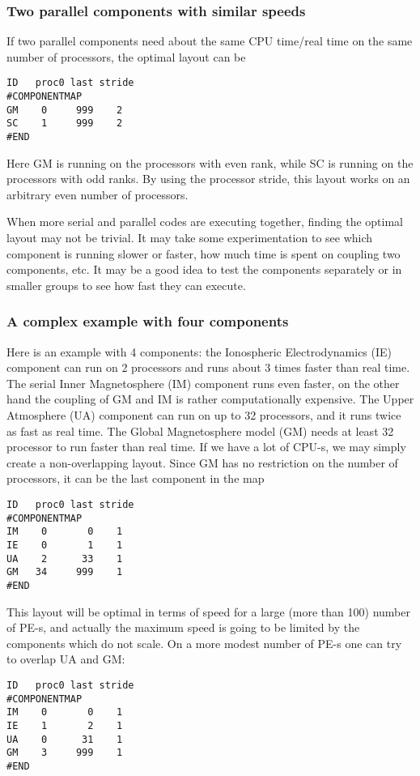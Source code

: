 \subsubsection{Two parallel components with similar speeds}

If two parallel components need about the same CPU time/real time
on the same number of processors, the optimal layout can be
\begin{verbatim}
ID   proc0 last stride
#COMPONENTMAP
GM    0     999    2
SC    1     999    2
#END
\end{verbatim}
Here GM is running on the processors with even rank,
while SC is running on the processors with odd ranks.
By using the processor stride, this layout works on
an arbitrary even number of processors.

When more serial and parallel codes are executing together,
finding the optimal layout may not be trivial. 
It may take some experimentation to see which component
is running slower or faster, how much time is spent
on coupling two components, etc. It may be a good idea
to test the components separately or in smaller groups
to see how fast they can execute.

\subsubsection{A complex example with four components}

Here is an example with 4 components: the Ionospheric
Electrodynamics (IE) component can run on 2 processors and 
runs about 3 times faster than real time.
The serial Inner Magnetosphere (IM) component runs even faster,
on the other hand the coupling of GM and IM is rather
computationally expensive. The Upper Atmosphere (UA) component
can run on up to 32 processors, and it runs twice as fast
as real time. The Global Magnetosphere model (GM) needs
at least 32 processor to run faster than real time.
If we have a lot of CPU-s, we may simply create a non-overlapping
layout. Since GM has no restriction on the number of processors,
it can be the last component in the map
\begin{verbatim}
ID   proc0 last stride
#COMPONENTMAP
IM    0       0    1
IE    0       1    1
UA    2      33    1
GM   34     999    1
#END
\end{verbatim}
This layout will be optimal in terms of speed for a large 
(more than 100) number of PE-s, and actually the maximum
speed is going to be limited by the components which do
not scale. On a more modest number of PE-s one can try
to overlap UA and GM:
\begin{verbatim}
ID   proc0 last stride
#COMPONENTMAP
IM    0       0    1
IE    1       2    1
UA    0      31    1
GM    3     999    1
#END
\end{verbatim}

